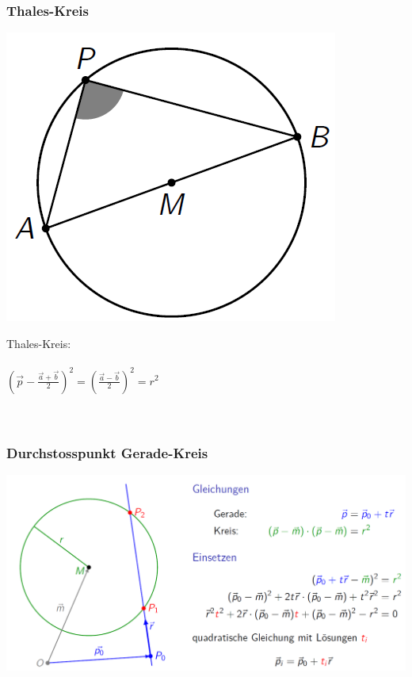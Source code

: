 			\subsubsection{Thales-Kreis}
			\begin{minipage}[b]{.45\linewidth} 
  			\includegraphics[width=0.7\linewidth]{Bilder/thales-kreis}
			\end{minipage}
			\hfill
			\begin{minipage}[b]{.5\linewidth} 
  			Thales-Kreis: \\
  			\\
  			$\left( \vec{p} - \frac{\vec{a} + \vec{b}}{2} \right) ^2 = \left( \frac{\vec{a} - \vec{b}}{2} \right) ^2 = r^2$	\\
  			\\
  			\\
			\end{minipage}		
			
			
						
			
			
			\subsubsection{Durchstosspunkt Gerade-Kreis}
				\includegraphics[width=0.8\linewidth]{Bilder/durchstosspunkt-gerade-kreis}	
			
